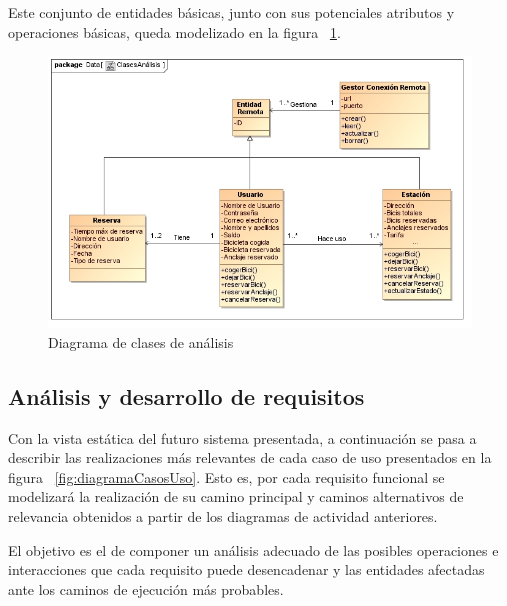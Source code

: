 Este conjunto de entidades básicas, junto con sus potenciales atributos y operaciones básicas, queda modelizado en la figura ~\ref{fig:diagramaClasesAnalisis}.

\begin{figure}
	\centering
	\includegraphics[width=\linewidth,height=\textheight,keepaspectratio]{Images/Diagramas/03_ClasesAnalisis}
	\caption{Diagrama de clases de análisis}
	\label{fig:diagramaClasesAnalisis}
\end{figure}

\subsection{Análisis y desarrollo de requisitos}

Con la vista estática del futuro sistema presentada, a continuación se pasa a describir las realizaciones más relevantes de cada caso de uso presentados en la figura ~\ref{fig:diagramaCasosUso}. Esto es, por cada requisito funcional se modelizará la realización de su camino principal y caminos alternativos de relevancia obtenidos a partir de los diagramas de actividad anteriores.

El objetivo es el de componer un análisis adecuado de las posibles operaciones e interacciones que cada requisito puede desencadenar y las entidades afectadas ante los caminos de ejecución más probables.

